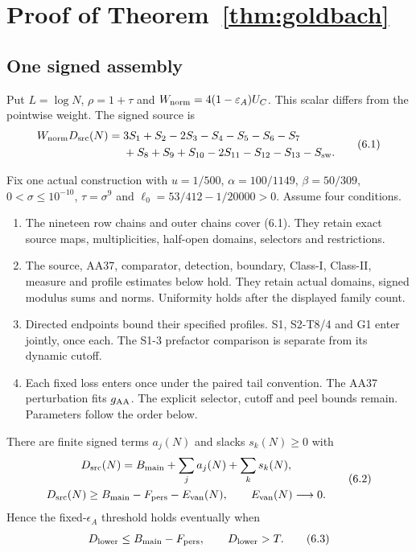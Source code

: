 \section{Proof of Theorem~\ref{thm:goldbach}}\label{sec:proof-theorem-1}

\subsection{One signed assembly}

Put $L=\log N$, $\rho=1+\tau$ and
$W_{\rm norm}=4(1-\varepsilon_A)U_C$.
This scalar differs from the pointwise weight.
The signed source is
\[
\begin{split}
W_{\rm norm}D_{\rm src}(N)={}&3S_1+S_2-2S_3-S_4-S_5-S_6-S_7\\
&+S_8+S_9+S_{10}-2S_{11}-S_{12}-S_{13}-S_{\rm sw}.
\end{split}\tag{6.1}
\]

\begin{theorem}\label{thm:signed-assembly}
Fix one actual construction with
$u=1/500$, $\alpha=100/1149$, $\beta=50/309$,
$0<\sigma\le10^{-10}$, $\tau=\sigma^9$ and
$\ell_0=53/412-1/20000>0$.
Assume four conditions.
\begin{enumerate}
\item The nineteen row chains and outer chains cover (6.1).
They retain exact source maps, multiplicities, half-open domains,
selectors and restrictions.
\item The source, AA37, comparator, detection, boundary, Class-I,
Class-II, measure and profile estimates below hold.
They retain actual domains, signed modulus sums and norms.
Uniformity holds after the displayed family count.
\item Directed endpoints bound their specified profiles.
S1, S2-T8/4 and G1 enter jointly, once each.
The S1-3 prefactor comparison is separate from its dynamic cutoff.
\item Each fixed loss enters once under the paired tail convention.
The AA37 perturbation fits $g_{\rm AA}$.
The explicit selector, cutoff and peel bounds remain.
Parameters follow the order below.
\end{enumerate}
There are finite signed terms $a_j(N)$ and slacks $s_k(N)\ge0$ with
\[
\begin{gathered}
D_{\rm src}(N)=B_{\rm main}+\sum_j a_j(N)+\sum_k s_k(N),\\
D_{\rm src}(N)\ge B_{\rm main}-F_{\rm pers}-E_{\rm van}(N),
\qquad E_{\rm van}(N)\longrightarrow0.
\end{gathered}\tag{6.2}
\]
Hence the fixed-$\epsilon_A$ threshold holds eventually when
\[
D_{\rm lower}\le B_{\rm main}-F_{\rm pers},\qquad
D_{\rm lower}>T.\tag{6.3}
\]
\end{theorem}

